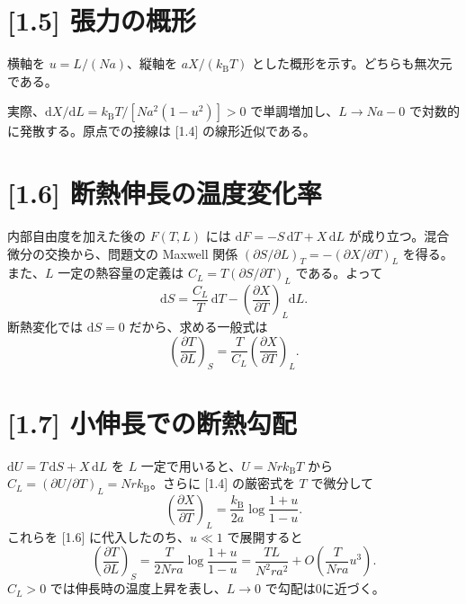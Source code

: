 \documentclass[11pt,a4paper]{article}
\begin{document}
\section*{[1.5] 張力の概形}
横軸を $u=L/(Na)$、縦軸を $aX/(k_{\mathrm B}T)$ とした概形を示す。どちらも無次元である。
\begin{center}
\end{center}
実際、$\mathrm dX/\mathrm dL=k_{\mathrm B}T/[Na^2(1-u^2)]>0$ で単調増加し、$L\to Na-0$ で対数的に発散する。原点での接線は [1.4] の線形近似である。

\section*{[1.6] 断熱伸長の温度変化率}
内部自由度を加えた後の $F(T,L)$ には $\mathrm dF=-S\,\mathrm dT+X\,\mathrm dL$ が成り立つ。混合微分の交換から、問題文の Maxwell 関係
$ (\partial S/\partial L)_T=-(\partial X/\partial T)_L $ を得る。また、$L$ 一定の熱容量の定義は $C_L=T(\partial S/\partial T)_L$ である。よって
\[
\mathrm dS=\frac{C_L}{T}\,\mathrm dT
-\left(\frac{\partial X}{\partial T}\right)_L\mathrm dL.
\]
断熱変化では $\mathrm dS=0$ だから、求める一般式は
\[
\boxed{\left(\frac{\partial T}{\partial L}\right)_S
=\frac{T}{C_L}\left(\frac{\partial X}{\partial T}\right)_L.}
\]

\section*{[1.7] 小伸長での断熱勾配}
$\mathrm dU=T\,\mathrm dS+X\,\mathrm dL$ を $L$ 一定で用いると、$U=Nrk_{\mathrm B}T$ から $C_L=(\partial U/\partial T)_L=Nrk_{\mathrm B}$。さらに [1.4] の厳密式を $T$ で微分して
\[
\left(\frac{\partial X}{\partial T}\right)_L
=\frac{k_{\mathrm B}}{2a}\log\frac{1+u}{1-u}.
\]
これらを [1.6] に代入したのち、$u\ll1$ で展開すると
\[
\left(\frac{\partial T}{\partial L}\right)_S
=\frac{T}{2Nra}\log\frac{1+u}{1-u}
=\boxed{\frac{TL}{N^2ra^2}
+O\!\left(\frac{T}{Nra}u^3\right)}.
\]
$C_L>0$ では伸長時の温度上昇を表し、$L\to0$ で勾配は0に近づく。
\end{document}
